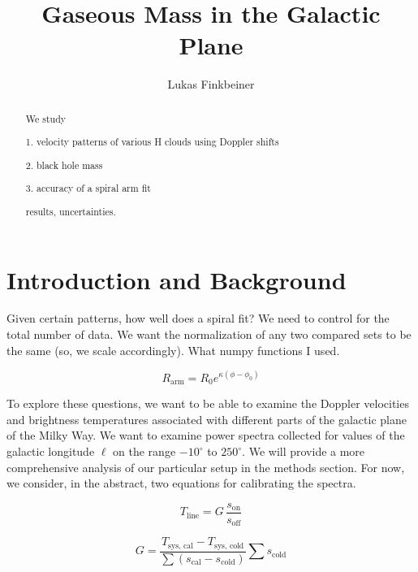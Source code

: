 \documentclass[12pt]{article}
\title{Gaseous Mass in the Galactic Plane}
\author{Lukas Finkbeiner}
\begin{document}
\maketitle

\begin{abstract}


We study

1. velocity patterns of various H clouds using Doppler shifts

2. black hole mass

3. accuracy of a spiral arm fit

results, uncertainties.

\end{abstract}

\section{Introduction and Background}

Given certain patterns, how well does a spiral fit? We need to control for the total number of data. We want the normalization of any two compared sets to be the same (so, we scale accordingly). What numpy functions I used.

\begin{equation} \label{eq:spiral}
R_\text{arm} = R_0 e^{\kappa(\phi - \phi_0)}
\end{equation}

To explore these questions, we want to be able to examine the Doppler velocities and brightness temperatures associated with different parts of the galactic plane of the Milky Way. We want to examine power spectra collected for values of the galactic longitude $\ell$ on the range $-10^\circ$ to $250^\circ$. We will provide a more comprehensive analysis of our particular setup in the methods section. For now, we consider, in the abstract, two equations for calibrating the spectra. 

\begin{equation} \label{eq:line_shape}
T_\text{line} = G \, \frac{s_\text{on}}{s_\text{off}}
\end{equation}

\begin{equation} \label{eq:line_gain}
G = \frac{T_\text{sys, cal} - T_\text{sys, cold}}{\sum{(s_\text{cal} - s_\text{cold})}} \sum{s_\text{cold}}
\end{equation}
\end{document}
